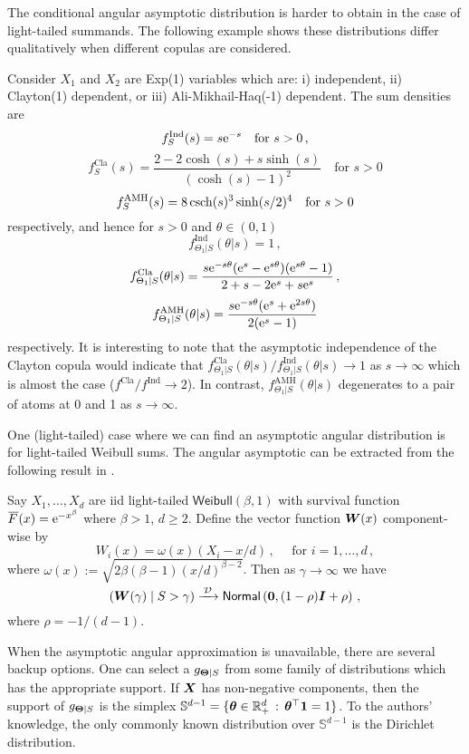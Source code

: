 The conditional angular asymptotic distribution is harder to obtain in the case of light-tailed summands. The following example shows these distributions differ qualitatively when different copulas are considered.

\begin{example}
Consider $X_1$ and $X_2$ are \textsf{Exp}(1) variables which are: i) independent, ii) \textsf{Clayton}(1) dependent, or iii) \textsf{Ali-Mikhail-Haq}(-1) dependent. The sum densities are
\[ f_S^{\mathrm{Ind}}(s) = s \mathrm{e}^{-s} \quad \text{for } s > 0 \,, \]
\[ f_S^{\mathrm{Cla}}(s) = \frac{2 - 2 \cosh(s) + s \sinh(s)}{(\cosh(s)-1)^2} \quad \text{for } s > 0 \]
\[ f_S^{\mathrm{AMH}}(s) = 8 \operatorname{csch}(s)^3 \sinh(s/2)^4 \quad \text{for } s > 0 \]
respectively, and hence for $s>0$ and $\theta \in (0,1)$
\[ f^{\mathrm{Ind}}_{\Theta_1 | S}(\theta | s) = 1 \,, \]
\[ f^{\mathrm{Cla}}_{\Theta_1 | S}(\theta | s) = \frac{ s \mathrm{e}^{-s \theta}(\mathrm{e}^s - \mathrm{e}^{s \theta})(\mathrm{e}^{s \theta}-1)}{2 + s - 2\mathrm{e}^s + s \mathrm{e}^s} \,, \]
\[ f^{\mathrm{AMH}}_{\Theta_1 | S}(\theta | s) = \frac{ s \mathrm{e}^{-s \theta}(\mathrm{e}^s + \mathrm{e}^{2 s \theta})}{2(\mathrm{e}^s - 1)}  \]
respectively. It is interesting to note that the asymptotic independence of the Clayton copula would indicate that $f^{\mathrm{Cla}}_{\Theta_1 | S}(\theta | s) / f^{\mathrm{Ind}}_{\Theta_1 | S}(\theta | s) \to 1$ as $s\to\infty$ which is almost the case ($f^{\mathrm{Cla}} /  f^{\mathrm{Ind}} \to 2$). In contrast, $f^{\mathrm{AMH}}_{\Theta_1 | S}(\theta | s)$ degenerates to a pair of atoms at 0 and 1 as $s \to \infty$.
\end{example}

One (light-tailed) case where we can find an asymptotic angular distribution is for light-tailed Weibull sums. The angular asymptotic can be extracted from the following result in \cite{asmussen2017tail}.

\begin{proposition} \label{prop:light_weibull_angles}
Say $X_1, \dots, X_d$ are iid light-tailed $\mathsf{Weibull}(\beta, 1)$ with survival function $\Ftail(x)=\e^{-x^\beta}$ where $\beta>1$, $d \ge 2$.
Define the vector function $\bm{W}(x)$ component-wise by
\[ W_i(x) = \omega(x) ( X_i - x/d) \,, \quad \text{ for } i=1,\dots,d\,, \]
where $\omega(x) := \sqrt{2  \beta (\beta-1) (x/d)^{\beta-2}}$.
Then as $\gamma \to \infty$ we have
\[ (\bm{W}(\gamma) \mid S > \gamma) \xrightarrow{\:\smash{\mathcal{D}}\:} \mathsf{Normal}\left(\bm{0}, (1 - \rho) \bm{I} + \rho \right) \,,\]
where $\rho = -1/(d-1)$.
\end{proposition}

When the asymptotic angular approximation is unavailable, there are several backup options.
One can select a $g_{\bm{\Theta} \mid S}$ from some family of distributions which has the appropriate support.
If $\bm{X}$ has non-negative components, then the support of $g_{\bm{\Theta} \mid S}$ is the simplex
$ \mathbb{S}^{d-1} = \{ \bm{\theta} \in \mathbb{R}_+^d \, : \, \bm{\theta}^\top\bm{1} = 1 \}$.
To the authors' knowledge, the only commonly known distribution over $\mathbb{S}^{d-1}$ is the Dirichlet distribution.

